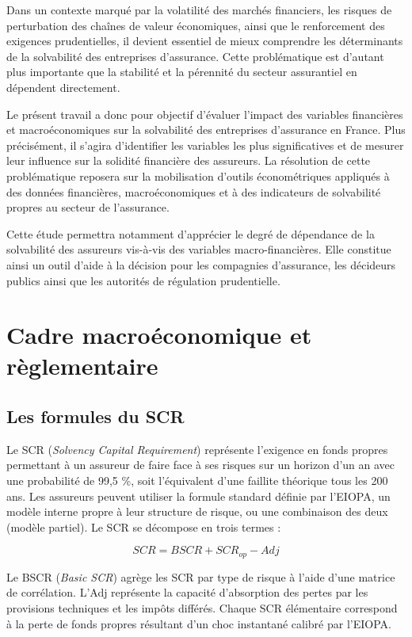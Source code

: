 \documentclass[
]{article}
\begin{document}
Dans un contexte marqué par la volatilité des marchés financiers, les
risques de perturbation des chaînes de valeur économiques, ainsi que le
renforcement des exigences prudentielles, il devient essentiel de mieux
comprendre les déterminants de la solvabilité des entreprises
d'assurance. Cette problématique est d'autant plus importante que la
stabilité et la pérennité du secteur assurantiel en dépendent
directement.

Le présent travail a donc pour objectif d'évaluer l'impact des variables
financières et macroéconomiques sur la solvabilité des entreprises
d'assurance en France. Plus précisément, il s'agira d'identifier les
variables les plus significatives et de mesurer leur influence sur la
solidité financière des assureurs. La résolution de cette problématique
reposera sur la mobilisation d'outils économétriques appliqués à des
données financières, macroéconomiques et à des indicateurs de
solvabilité propres au secteur de l'assurance.

Cette étude permettra notamment d'apprécier le degré de dépendance de la
solvabilité des assureurs vis-à-vis des variables macro-financières.
Elle constitue ainsi un outil d'aide à la décision pour les compagnies
d'assurance, les décideurs publics ainsi que les autorités de régulation
prudentielle.

\section{Cadre macroéconomique et
règlementaire}\label{cadre-macrouxe9conomique-et-ruxe8glementaire}

\subsection{Les formules du SCR}\label{les-formules-du-scr}

Le SCR (\emph{Solvency Capital Requirement}) représente l'exigence en
fonds propres permettant à un assureur de faire face à ses risques sur
un horizon d'un an avec une probabilité de 99,5 \%, soit l'équivalent
d'une faillite théorique tous les 200 ans. Les assureurs peuvent
utiliser la formule standard définie par l'EIOPA, un modèle interne
propre à leur structure de risque, ou une combinaison des deux (modèle
partiel). Le SCR se décompose en trois termes :

\[SCR = BSCR + SCR_{op} - Adj\]

Le BSCR (\emph{Basic SCR}) agrège les SCR par type de risque à l'aide
d'une matrice de corrélation. L'Adj représente la capacité d'absorption
des pertes par les provisions techniques et les impôts différés. Chaque
SCR élémentaire correspond à la perte de fonds propres résultant d'un
choc instantané calibré par l'EIOPA.
\end{document}
